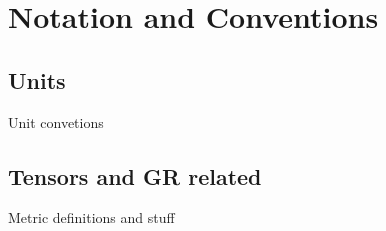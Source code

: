 
\chapter*{Notation and Conventions}

\section*{Units}

Unit convetions

\section*{Tensors and GR related}

Metric definitions and stuff

\cleardoublepage